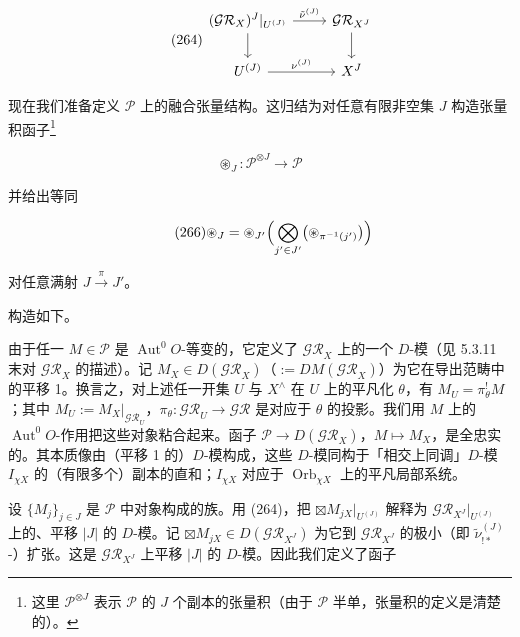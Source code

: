 \begin{equation}\tag{264}
\begin{tikzcd}
(\mathcal{GR}_X)^{J}|_{U^{(J)}} \arrow[r,"\tilde\nu^{(J)}"] \arrow[d] & \mathcal{GR}_{X^{J}} \arrow[d]\\
U^{(J)} \arrow[r,"\nu^{(J)}"] & X^{J}
\end{tikzcd}
\end{equation}

 现在我们准备定义 $\mathcal{P}$ 上的融合张量结构。这归结为对任意有限非空集 $J$ 构造张量积函子\footnote{这里 $\mathcal{P}^{\otimes J}$ 表示 $\mathcal{P}$ 的 $J$ 个副本的张量积（由于 $\mathcal{P}$ 半单，张量积的定义是清楚的）。}

\begin{equation}\tag{265}
\circledast_J:\mathcal{P}^{\otimes J}\to\mathcal{P}
\end{equation}

并给出等同

\begin{equation}\tag{266}
\circledast_J=\circledast_{J'}\Bigl(\bigotimes_{j'\in J'}\bigl(\circledast_{\pi^{-1}(j')}\bigr)\Bigr)
\end{equation}

对任意满射 $J\xrightarrow{\pi}J'$。

构造如下。

 由于任一 $M\in\mathcal{P}$ 是 $\operatorname{Aut}^{0}O$-等变的，它定义了 $\mathcal{GR}_X$ 上的一个 $D$-模（见 5.3.11 末对 $\mathcal{GR}_X$ 的描述）。记 $M_X\in D(\mathcal{GR}_X)$（$:=DM(\mathcal{GR}_X)$）为它在导出范畴中的平移 1。换言之，对上述任一开集 $U$ 与 $X^{\wedge}$ 在 $U$ 上的平凡化 $\theta$，有 $M_U=\pi_\theta^{!}M$；其中 $M_U:=M_X|_{\mathcal{GR}_U}$，$\pi_\theta:\mathcal{GR}_U\to\mathcal{GR}$ 是对应于 $\theta$ 的投影。我们用 $M$ 上的 $\operatorname{Aut}^{0}O$-作用把这些对象粘合起来。函子 $\mathcal{P}\to D(\mathcal{GR}_X)$，$M\mapsto M_X$，是全忠实的。其本质像由（平移 1 的）$D$-模构成，这些 $D$-模同构于「相交上同调」$D$-模 $I_{\chi X}$ 的（有限多个）副本的直和；$I_{\chi X}$ 对应于 $\operatorname{Orb}_{\chi X}$ 上的平凡局部系统。


设 $\{M_j\}_{j\in J}$ 是 $\mathcal{P}$ 中对象构成的族。用 (264)，把 $\boxtimes M_{jX}|_{U^{(J)}}$ 解释为 $\mathcal{GR}_{X^{J}}|_{U^{(J)}}$ 上的、平移 $|J|$ 的 $D$-模。记 $\boxtimes M_{jX}\in D(\mathcal{GR}_{X^{J}})$ 为它到 $\mathcal{GR}_{X^{J}}$ 的极小（即 $\tilde\nu^{(J)}_{!*}$-）扩张。这是 $\mathcal{GR}_{X^{J}}$ 上平移 $|J|$ 的 $D$-模。因此我们定义了函子


